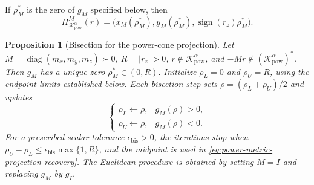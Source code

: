 \documentclass[letterpaper]{article} %
\newtheorem{proposition}[theorem]{Proposition}
\theoremstyle{definition}
\theoremstyle{remark}
\begin{document}
If $\rho_M^*$ is the zero of $g_M$ specified below, then
\begin{equation}
\label{eq:power-metric-projection-recovery}
    \Pi_{\mathcal K_{\mathrm{pow}}^\alpha}^{M}(r)
    =\bigl(x_M(\rho_M^*),y_M(\rho_M^*),
      \operatorname{sign}(r_z)\rho_M^*\bigr).
\end{equation}

\begin{proposition}[Bisection for the power-cone projection]
\label{prop:power-cone-bisection}
Let $M=\operatorname{diag}(m_x,m_y,m_z)\succ0$, $R=|r_z|>0$,
$r\notin\mathcal K_{\mathrm{pow}}^\alpha$, and
$-Mr\notin(\mathcal K_{\mathrm{pow}}^\alpha)^*$. Then $g_M$ has a unique zero
$\rho_M^*\in(0,R)$. Initialize $\rho_L=0$ and $\rho_U=R$, using the endpoint
limits established below. Each bisection step sets
$\rho=(\rho_L+\rho_U)/2$ and updates
\begin{equation}
\label{eq:power-cone-bisection-update}
    \begin{cases}
        \rho_L\leftarrow\rho, & g_M(\rho)>0,\\
        \rho_U\leftarrow\rho, & g_M(\rho)<0.
    \end{cases}
\end{equation}
For a prescribed scalar tolerance $\epsilon_{\mathrm{bis}}>0$, the iterations
stop when $\rho_U-\rho_L\le
\epsilon_{\mathrm{bis}}\max\{1,R\}$, and the midpoint is used in
\eqref{eq:power-metric-projection-recovery}.
The Euclidean procedure is obtained by setting $M=I$ and replacing
$g_M$ by $g_I$.
\end{proposition}
\end{document}

